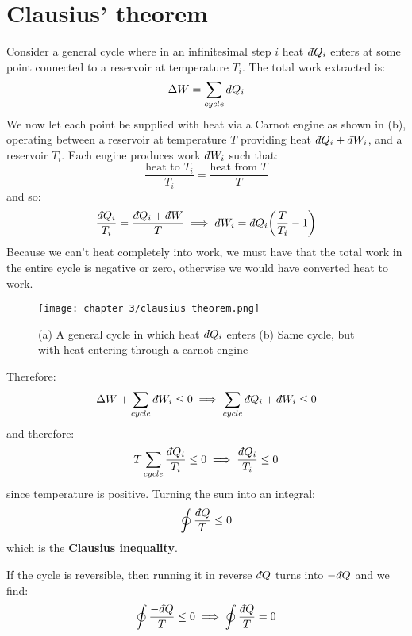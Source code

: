 \documentclass[a4paper,11pt,oneside]{book}
\newcommand{\dbar}{d\hspace*{-0.08em}\bar{}\hspace*{0.1em}}
\begin{document}
\section{Clausius' theorem}
Consider a general cycle where in an infinitesimal step $i$ heat $\dbar Q_i$ enters at some point connected to  a reservoir at temperature $T_i$. The total work extracted is:
\begin{equation}
    \Delta W = \sum_{cycle} \dbar Q_i
\end{equation}
We now let each point be supplied with heat via a Carnot engine as shown in (b), operating between a reservoir at temperature $T$ providing heat $\dbar Q_i + \dbar W_i$, and a reservoir $T_i$. Each engine produces work $\dbar W_i$ such that:
\begin{equation}
    \frac{\text{heat to } T_i}{T_i}= \frac{\text{heat from } T}{T}
\end{equation}
and so:
\begin{equation}
    \frac{\dbar Q_i}{T_i}=\frac{\dbar Q_i + \dbar W}{T} \implies \dbar W_i = \dbar Q_i \bigg(\frac{T}{T_i}-1\bigg)
\end{equation}
Because we can't heat completely into work, we must have that the total work in the entire cycle is negative or zero, otherwise we would have converted heat to work.

\begin{figure}[h!]
    \centering
    \texttt{[image: chapter 3/clausius theorem.png]}
    \caption{(a) A general cycle in which heat $\dbar Q_i$ enters (b) Same cycle, but with heat entering through a carnot engine}
    \label{fig:my_label}
\end{figure}

Therefore:
\begin{equation}
    \Delta W + \sum_{cycle} \dbar W_i \leq 0  \implies \sum_{cycle}\dbar Q_i + \dbar W_i \leq 0
\end{equation}
and therefore:
\begin{equation}
    T \sum_{cycle} \frac{\dbar Q_i}{T_i} \leq 0 \implies \frac{\dbar Q_i}{T_i} \leq 0
\end{equation}
since temperature is positive. Turning the sum into an integral:
\begin{equation}
    \oint \frac{\dbar Q}{T} \leq 0
\end{equation}
which is the \textbf{Clausius inequality}.

If the cycle is reversible, then running it in reverse $\dbar Q $ turns into $-\dbar Q$ and we find:
\begin{equation}
    \oint \frac{-\dbar Q}{T} \leq 0 \implies   \oint \frac{\dbar Q}{T}=0
\end{equation}
\end{document}
